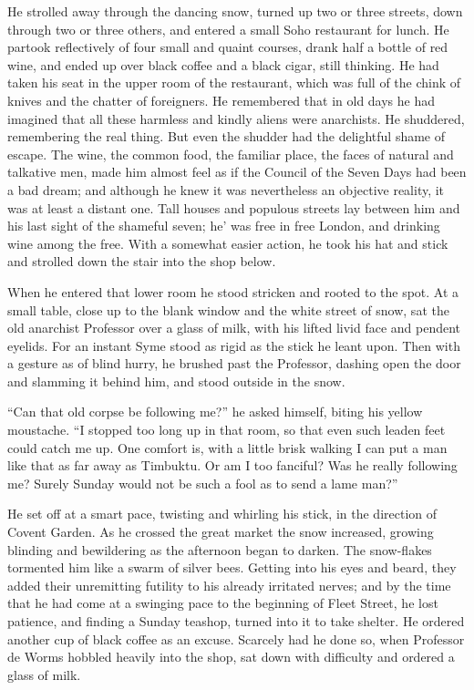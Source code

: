 \documentclass{book}
\begin{document}
He strolled away through the dancing snow, turned up two or three streets, down through two or three others, and entered a small Soho restaurant for lunch. He partook reflectively of four small and quaint courses, drank half a bottle of red wine, and ended up over black coffee and a black cigar, still thinking. He had taken his seat in the upper room of the restaurant, which was full of the chink of knives and the chatter of foreigners. He remembered that in old days he had imagined that all these harmless and kindly aliens were anarchists. He shuddered, remembering the real thing. But even the shudder had the delightful shame of escape. The wine, the common food, the familiar place, the faces of natural and talkative men, made him almost feel as if the Council of the Seven Days had been a bad dream; and although he knew it was nevertheless an objective reality, it was at least a distant one. Tall houses and populous streets lay between him and his last sight of the shameful seven; he’ was free in free London, and drinking wine among the free. With a somewhat easier action, he took his hat and stick and strolled down the stair into the shop below.

When he entered that lower room he stood stricken and rooted to the spot. At a small table, close up to the blank window and the white street of snow, sat the old anarchist Professor over a glass of milk, with his lifted livid face and pendent eyelids. For an instant Syme stood as rigid as the stick he leant upon. Then with a gesture as of blind hurry, he brushed past the Professor, dashing open the door and slamming it behind him, and stood outside in the snow.

“Can that old corpse be following me?” he asked himself, biting his yellow moustache. “I stopped too long up in that room, so that even such leaden feet could catch me up. One comfort is, with a little brisk walking I can put a man like that as far away as Timbuktu. Or am I too fanciful? Was he really following me? Surely Sunday would not be such a fool as to send a lame man?”

He set off at a smart pace, twisting and whirling his stick, in the direction of Covent Garden. As he crossed the great market the snow increased, growing blinding and bewildering as the afternoon began to darken. The snow-flakes tormented him like a swarm of silver bees. Getting into his eyes and beard, they added their unremitting futility to his already irritated nerves; and by the time that he had come at a swinging pace to the beginning of Fleet Street, he lost patience, and finding a Sunday teashop, turned into it to take shelter. He ordered another cup of black coffee as an excuse. Scarcely had he done so, when Professor de Worms hobbled heavily into the shop, sat down with difficulty and ordered a glass of milk.
\end{document}
